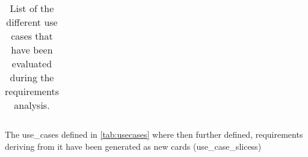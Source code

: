 \begin{landscape}
\begin{longtable}{ l c p{8cm} l l p{3cm} }
		\caption{List of the different use cases that have been evaluated during the requirements analysis.}	
		\label{tab:usecases}
	\end{longtable}
\end{landscape}

The \glspl{use_case} defined in \autoref{tab:usecases} where then further defined, requirements deriving from it have been generated as new cards (\glspl{use_case_slices})



